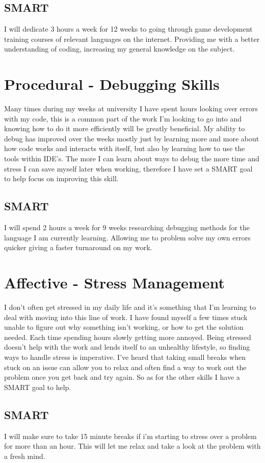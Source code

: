\documentclass{scrartcl}
\begin{document}
\subsection{SMART}
I will dedicate 3 hours a week for 12 weeks to going through game development training courses of relevant languages on the internet. Providing me with a better understanding of coding, increasing my general knowledge on the subject.


\section{Procedural - Debugging Skills}
Many times during my weeks at university I have spent hours looking over errors with my code, this is a common part of the work I'm looking to go into and knowing how to do it more efficiently will be greatly beneficial. My ability to debug has improved over the weeks mostly just by learning more and more about how code works and interacts with itself, but also by learning how to use the tools within IDE's. The more I can learn about ways to debug the more time and stress I can save myself later when working, therefore I have set a SMART goal to help focus on improving this skill.
\subsection{SMART}
I will spend 2 hours a week for 9 weeks researching debugging methods for the language I am currently learning. Allowing me to problem solve my own errors quicker giving a faster turnaround on my work.


\section{Affective - Stress Management}
I don't often get stressed in my daily life and it's something that I'm learning to deal with moving into this line of work. I have found myself a few times stuck unable to figure out why something isn't working, or how to get the solution needed. Each time spending hours slowly getting more annoyed. Being stressed doesn't help with the work and lends itself to an unhealthy lifestyle, so finding ways to handle stress is imperative. I've heard that taking small breaks when stuck on an issue can allow you to relax and often find a way to work out the problem once you get back and try again. So as for the other skills I have a SMART goal to help.
\subsection{SMART}
I will make sure to take 15 minute breaks if i'm starting to stress over a problem for more than an hour. This will let me relax and take a look at the problem with a fresh mind.
\end{document}
